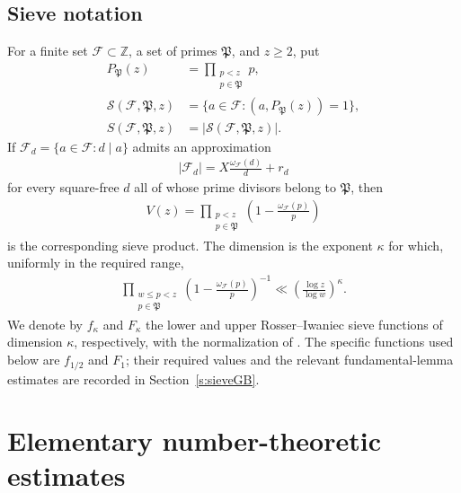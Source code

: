 \documentclass[12pt,reqno]{amsart}
\numberwithin{equation}{section}
\theoremstyle{definition}
\theoremstyle{remark}
\begin{document}
\subsection{Sieve notation}

For a finite set $\mathcal F\subset\mathbb Z$, a set of primes
$\mathfrak P$, and $z\geq2$, put
\begin{align}\label{e:sievenotation}
 P_{\mathfrak P}(z)&=\prod_{\substack{p<z\\p\in\mathfrak P}}p,\\
 \mathcal S(\mathcal F,\mathfrak P,z)
 &=\{a\in\mathcal F:(a,P_{\mathfrak P}(z))=1\},\\
 S(\mathcal F,\mathfrak P,z)&=|\mathcal S(\mathcal F,\mathfrak P,z)|.
\end{align}
If $\mathcal F_d=\{a\in\mathcal F:d\mid a\}$ admits an approximation
\begin{align*}
 |\mathcal F_d|=X\frac{\omega_{\mathcal F}(d)}d+r_d
\end{align*}
for every square-free \(d\) all of whose prime divisors belong to
\(\mathfrak P\), then
\begin{align}\label{e:sieveproduct}
 V(z)=\prod_{\substack{p<z\\p\in\mathfrak P}}
 \left(1-\frac{\omega_{\mathcal F}(p)}p\right)
\end{align}
is the corresponding sieve product.  The dimension is the exponent
$\kappa$ for which, uniformly in the required range,
\begin{align}\label{e:sievedimension}
 \prod_{\substack{w\leq p<z\\p\in \mathfrak{P}}}\left(1-\frac{\omega_{\mathcal F}(p)}p\right)^{-1}
 \ll\left(\frac{\log z}{\log w}\right)^\kappa.
\end{align}
We denote by \(f_\kappa\) and \(F_\kappa\) the lower and upper
Rosser--Iwaniec sieve functions of dimension \(\kappa\), respectively,
with the normalization of \cite[(1.8)--(1.10)]{I80}.  The specific
functions used below are \(f_{1/2}\) and \(F_1\); their required values
and the relevant fundamental-lemma estimates are recorded in
Section~\ref{s:sieveGB}.


\section{Elementary number-theoretic estimates}\label{s:nt}


\end{document}
